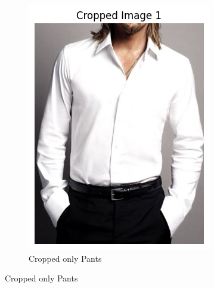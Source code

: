 \begin{figure}[H]
\begin{subfigure}[b]{0.2\textwidth}
      \includegraphics[width=\textwidth]{images/2cropped_image.png}
      \caption{Cropped only Pants}
  \end{subfigure}
\end{figure}

